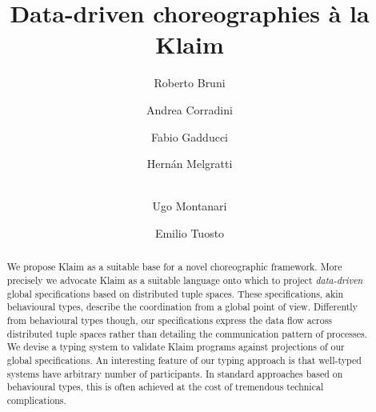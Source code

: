 \documentclass[runningheads,a4paper]{llncs}
\begin{document}
\mainmatter  %

\title{
  \iffinal
  Data-driven choreographies \`a la Klaim
  \else
  \fi
}


%
%

\author{
  Roberto Bruni  \and
  Andrea Corradini  \and
  Fabio Gadducci  \and
  Hern\'an Melgratti  \and
  \\
  Ugo Montanari  \and
  Emilio Tuosto
}

\iffinal
{}
\else
{}
\fi

\maketitle

\begin{abstract}
  We propose Klaim as a suitable base for a novel choreographic
  framework.
  More precisely we advocate Klaim as a suitable language onto which
  to project \emph{data-driven} global specifications based on
  distributed tuple spaces.
  These specifications, akin behavioural types, describe the coordination
  from a global point of view.
  Differently from behavioural types though, our specifications
  express the data flow across distributed tuple spaces rather than
  detailing the communication pattern of processes.
  We devise a typing system to validate Klaim programs against projections
  of our global specifications.
  An interesting feature of our typing approach is that well-typed
  systems have arbitrary number of participants.
  In standard approaches based on behavioural types, this is often
  achieved at the cost of tremendous technical complications.
\end{abstract}
\end{document}
